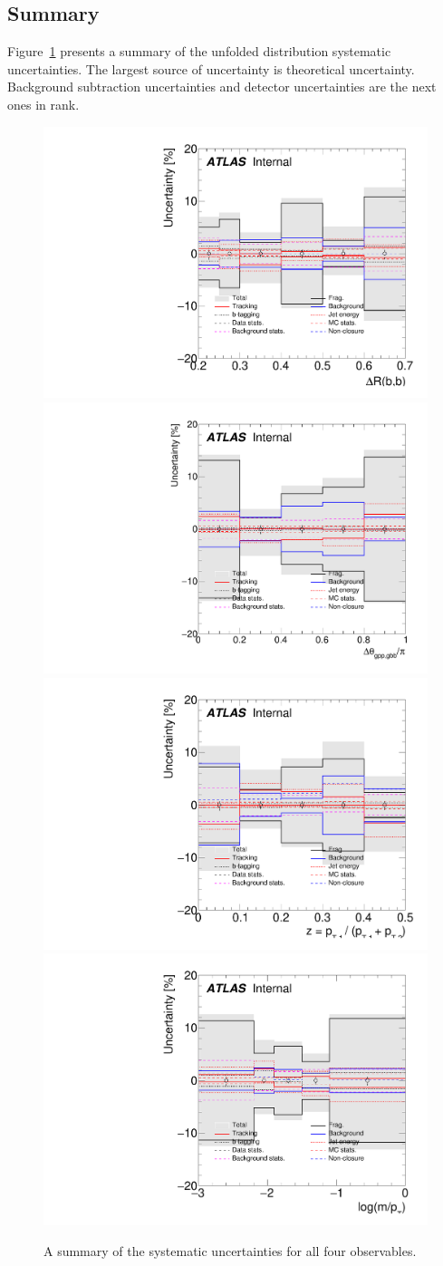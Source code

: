 \subsection{Summary}
\label{sec:gbb-systs:overview}

Figure~\ref{fig:syst_overview_deltaR} presents a summary of the unfolded distribution systematic uncertainties. The largest source of uncertainty is theoretical uncertainty. Background subtraction uncertainties and detector uncertainties are the next ones in rank.

\begin{figure}[htpb!]
\begin{center}
\includegraphics[width=0.45\linewidth]{figures/gbb/Unfolding/dR_uncert_summary.pdf}\includegraphics[width=0.45\linewidth]{figures/gbb/Unfolding/dphi_uncert_summary.pdf}\\
\includegraphics[width=0.45\linewidth]{figures/gbb/Unfolding/ZpT_uncert_summary.pdf}\includegraphics[width=0.45\linewidth]{figures/gbb/Unfolding/fracmasspt_uncert_summary.pdf}
\caption[]{A summary of the systematic uncertainties for all four observables. } 
\label{fig:syst_overview_deltaR}
\end{center}
\end{figure}

